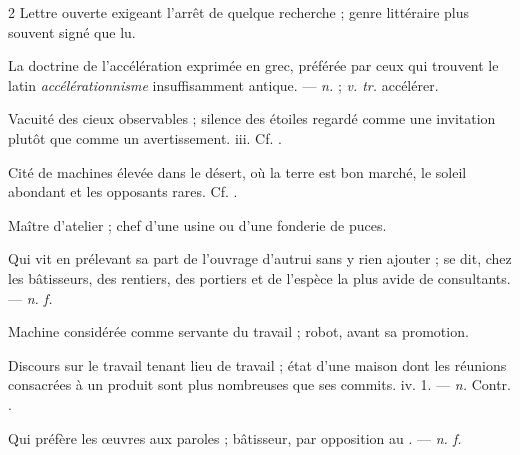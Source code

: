 \begin{multicols}{2}
 Lettre ouverte exigeant l'arrêt de quelque recherche ; genre littéraire plus souvent signé que lu.  

 La doctrine de l'accélération exprimée en grec, préférée par ceux qui trouvent le latin \textit{accélérationnisme} insuffisamment antique. —  \textit{n.} ;  \textit{v. tr.} accélérer.

 Vacuité des cieux observables ; silence des étoiles regardé comme une invitation plutôt que comme un avertissement.   iii. Cf. .

 Cité de machines élevée dans le désert, où la terre est bon marché, le soleil abondant et les opposants rares.   Cf. .

 Maître d'atelier ; chef d'une usine ou d'une fonderie de puces.

  Qui vit en prélevant sa part de l'ouvrage d'autrui sans y rien ajouter ; se dit, chez les bâtisseurs, des rentiers, des portiers et de l'espèce la plus avide de consultants. —  \textit{n. f.}

 Machine considérée comme servante du travail ; robot, avant sa promotion.

 Discours sur le travail tenant lieu de travail ; état d'une maison dont les réunions consacrées à un produit sont plus nombreuses que ses commits.   iv. 1. —  \textit{n.} Contr. .

 Qui préfère les œuvres aux paroles ; bâtisseur, par opposition au . —  \textit{n. f.}


\end{multicols}

